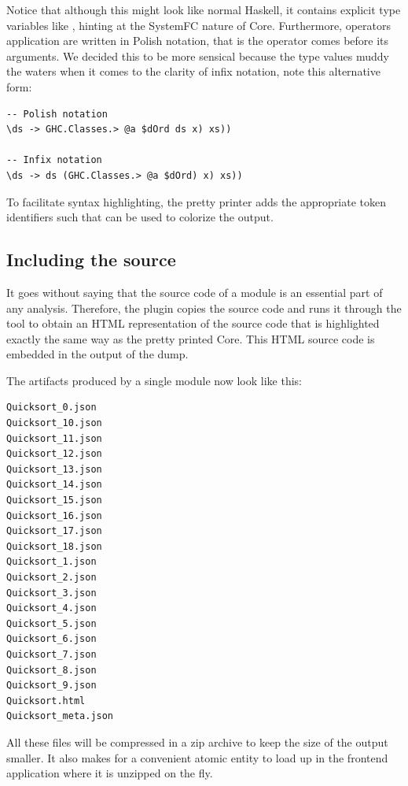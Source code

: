 Notice that although this might look like normal Haskell, it contains explicit type variables like
, hinting at the SystemFC nature of Core. Furthermore, operators application are written in 
Polish notation, that is the operator comes before its arguments. We decided this to be more sensical because the type
values muddy the waters when it comes to the clarity of infix notation, note this alternative form:

\begin{listing}[H]
\begin{verbatim}
-- Polish notation
\ds -> GHC.Classes.> @a $dOrd ds x) xs))

-- Infix notation
\ds -> ds (GHC.Classes.> @a $dOrd) x) xs))
\end{verbatim}
\end{listing}

To facilitate syntax highlighting, the pretty printer adds the appropriate token identifiers such that 
 \cite{pygments} can be used to colorize the output.


\subsection{Including the source}
It goes without saying that the source code of a module is an essential part of any analysis. Therefore,
the plugin copies the source code and runs it through the  \cite{pygments} tool to obtain
an HTML representation of the source code that is highlighted exactly the same way as the pretty printed Core.
This HTML source code is embedded in the output of the dump.

The artifacts produced by a single module now look like this:

\begin{listing}[H]
\begin{verbatim}
Quicksort_0.json
Quicksort_10.json
Quicksort_11.json
Quicksort_12.json
Quicksort_13.json
Quicksort_14.json
Quicksort_15.json
Quicksort_16.json
Quicksort_17.json
Quicksort_18.json
Quicksort_1.json
Quicksort_2.json
Quicksort_3.json
Quicksort_4.json
Quicksort_5.json
Quicksort_6.json
Quicksort_7.json
Quicksort_8.json
Quicksort_9.json
Quicksort.html
Quicksort_meta.json
\end{verbatim}
\end{listing}

All these files will be compressed in a zip archive to keep the size of the output smaller. It also makes for
a convenient atomic entity to load up in the frontend application where it is unzipped on the fly.


